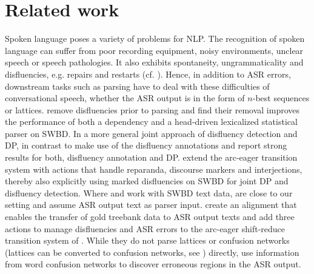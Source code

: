 \documentclass[11pt,letterpaper]{article}
\begin{document}
\section{Related work}\label{sec:related}
Spoken language poses a variety of problems for NLP. The recognition of spoken language can suffer from poor recording equipment, noisy environments, unclear speech or speech pathologies. It also exhibits spontaneity, ungrammaticality and disfluencies, e.g. repairs and restarts (cf. \citet{Shriberg:1994}). Hence, in addition to ASR errors, downstream tasks such as parsing have to deal with these difficulties of conversational speech, whether the ASR output is in the form of $n$-best sequences or lattices. \citet{Joergensen:2007} remove disfluencies prior to parsing and find their removal improves the performance of both a dependency and a head-driven lexicalized statistical parser on SWBD. In a more general joint approach of disfluency detection and DP, \citet{HonnibalJohnson:2014} in contrast to \citet{Joergensen:2007} make use of the disfluency annotations and report strong results for both, disfluency annotation and DP. \citet{RasooliTetreault:2013} extend the arc-eager transition system \citep{Nivre:2008} with actions that handle reparanda, discourse markers and interjections, thereby also explicitly using marked disfluencies on SWBD for joint DP and disfluency detection. Where \citet{RasooliTetreault:2013} and \citet{HonnibalJohnson:2014} work with SWBD text data, \citet{YoshikawaEtal:2016} are close to our setting and assume ASR output text as parser input. \citet{YoshikawaEtal:2016} create an alignment that enables the transfer of gold treebank data to ASR output texts and add three actions to manage disfluencies and ASR errors to the arc-eager shift-reduce transition system of \citet{ZhangNivre:2011}. While they do not parse lattices or confusion networks (lattices can be converted to confusion networks, see \citet{ManguEtal:2000}) directly, \citet{YoshikawaEtal:2016} use information from word confusion networks to discover erroneous regions in the ASR output.
\end{document}
